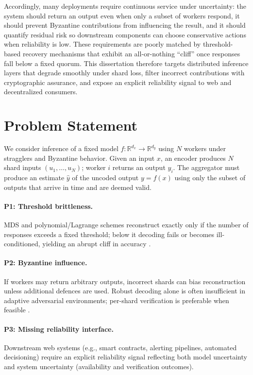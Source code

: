 \documentclass[sigconf]{acmart}
\begin{document}
Accordingly, many deployments require continuous service under uncertainty: the system should return an output even when only a subset of workers respond, it should prevent Byzantine contributions from influencing the result, and it should quantify residual risk so downstream components can choose conservative actions when reliability is low. These requirements are poorly matched by threshold-based recovery mechanisms that exhibit an all-or-nothing “cliff” once responses fall below a fixed quorum. This dissertation therefore targets distributed inference layers that degrade smoothly under shard loss, filter incorrect contributions with cryptographic assurance, and expose an explicit reliability signal to web and decentralized consumers.

\section{Problem Statement}
We consider inference of a fixed model $f:\mathbb{R}^{d_x}\!\to\!\mathbb{R}^{d_y}$ using $N$ workers under stragglers and Byzantine behavior.
Given an input $x$, an encoder produces $N$ shard inputs $(u_1,\dots,u_N)$; worker $i$ returns an output $y_i$.
The aggregator must produce an estimate $\hat y$ of the uncoded output $y=f(x)$ using only the subset of outputs that arrive in time and are deemed valid.

\paragraph{P1: Threshold brittleness.}
MDS and polynomial/Lagrange schemes reconstruct exactly only if the number of responses exceeds a fixed threshold; below it decoding fails or becomes ill-conditioned, yielding an abrupt cliff in accuracy \cite{yu2019lagrange}.

\paragraph{P2: Byzantine influence.}
If workers may return arbitrary outputs, incorrect shards can bias reconstruction unless additional defences are used.
Robust decoding alone is often insufficient in adaptive adversarial environments; per-shard verification is preferable when feasible \cite{tang2021avcc}.

\paragraph{P3: Missing reliability interface.}
Downstream web systems (e.g., smart contracts, alerting pipelines, automated decisioning) require an explicit reliability signal reflecting both model uncertainty and system uncertainty (availability and verification outcomes).
\end{document}
